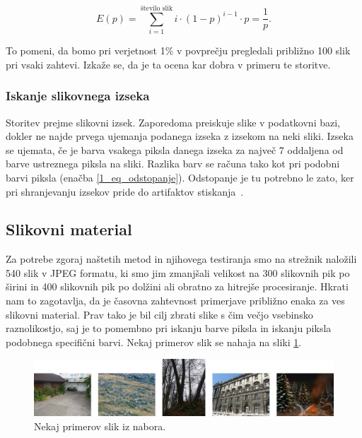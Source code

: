 \begin{equation} \label{1_eq_upanje}
E(p) = \sum_{i = 1}^{\text{število slik}} i \cdot (1 - p)^{i - 1} \cdot p = \frac{1}{p} .
\end{equation}

To pomeni, da bomo pri verjetnost 1\% v povprečju pregledali približno 100 slik pri vsaki zahtevi.
Izkaže se, da je ta ocena kar dobra v primeru te storitve.

\subsubsection{Iskanje slikovnega izseka}

Storitev prejme slikovni izsek.
Zaporedoma preiskuje slike v podatkovni bazi, dokler ne najde prvega ujemanja podanega izseka z izsekom na neki sliki.
Izseka se ujemata, če je barva vsakega piksla danega izseka za največ 7 oddaljena od barve ustreznega piksla na sliki.
Razlika barv se računa tako kot pri podobni barvi piksla (enačba \ref{1_eq_odstopanje}).
Odstopanje je tu potrebno le zato, ker pri shranjevanju izsekov pride do artifaktov stiskanja~\cite{1_wiki_compression}.

\subsection{Slikovni material}

Za potrebe zgoraj naštetih metod in njihovega testiranja smo na strežnik naložili 540 slik v JPEG formatu, ki smo jim zmanjšali velikost na 300 slikovnih pik po širini in 400 slikovnih pik po dolžini ali obratno za hitrejše procesiranje.
Hkrati nam to zagotavlja, da je časovna zahtevnost primerjave približno enaka za ves slikovni material.
Prav tako je bil cilj zbrati slike s čim večjo vsebinsko raznolikostjo, saj je to pomembno pri iskanju barve piksla in iskanju piksla podobnega specifični barvi.
Nekaj primerov slik se nahaja na sliki \ref{fig:1_sample_images}.

\begin{figure}[H]
    \centering
    \includegraphics[scale=0.16]{Img/1_sample_images.png}
    \caption{Nekaj primerov slik iz nabora.}
    \label{fig:1_sample_images}
\end{figure}

